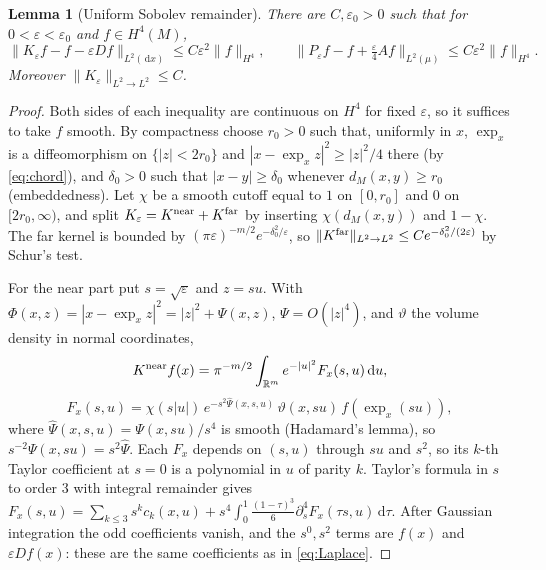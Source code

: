 \documentclass[11pt,a4paper]{article}
\newtheorem{lemma}[theorem]{Lemma}
\theoremstyle{definition}\newtheorem{definition}[theorem]{Definition}
\theoremstyle{remark}\newtheorem{remark}[theorem]{Remark}
\newcommand{\eps}{\varepsilon}
\newcommand{\dd}{\,\mathrm d}
\newcommand{\R}{\mathbb R}
\newcommand{\norm}[1]{\lVert #1\rVert}
\begin{document}
\begin{lemma}[Uniform Sobolev remainder]\label{lem:sobolev}
There are $C,\eps_0>0$ such that for $0<\eps<\eps_0$ and $f\in H^4(M)$,
\begin{equation}\label{eq:sobolevrem}
\norm{K_\eps f-f-\eps Df}_{L^2(\dd x)}\leq C\eps^2\norm f_{H^4},
\qquad
\norm{P_\eps f-f+\tfrac\eps4Af}_{L^2(\mu)}\leq C\eps^2\norm f_{H^4}.
\end{equation}
Moreover $\norm{K_\eps}_{L^2\to L^2}\leq C$.
\end{lemma}
\begin{proof}
Both sides of each inequality are continuous on $H^4$ for fixed $\eps$, so it suffices to take $f$ smooth.
By compactness choose $r_0>0$ such that, uniformly in $x$, $\exp_x$ is a diffeomorphism on $\{|z|<2r_0\}$ and $|x-\exp_xz|^2\geq|z|^2/4$ there (by \eqref{eq:chord}), and $\delta_0>0$ such that $|x-y|\geq\delta_0$ whenever $d_M(x,y)\geq r_0$ (embeddedness). Let $\chi$ be a smooth cutoff equal to $1$ on $[0,r_0]$ and $0$ on $[2r_0,\infty)$, and split $K_\eps=K^{\rm near}+K^{\rm far}$ by inserting $\chi(d_M(x,y))$ and $1-\chi$. The far kernel is bounded by $(\pi\eps)^{-m/2}e^{-\delta_0^2/\eps}$, so $\norm{K^{\rm far}}_{L^2\to L^2}\leq Ce^{-\delta_0^2/(2\eps)}$ by Schur's test.

For the near part put $s=\sqrt\eps$ and $z=su$. With $\Phi(x,z)=|x-\exp_xz|^2=|z|^2+\Psi(x,z)$, $\Psi=O(|z|^4)$, and $\vartheta$ the volume density in normal coordinates,
\[
K^{\rm near}f(x)=\pi^{-m/2}\int_{\R^m}e^{-|u|^2}F_x(s,u)\dd u,\]
\[F_x(s,u)=\chi(s|u|)\,e^{-s^2\widehat\Psi(x,s,u)}\,\vartheta(x,su)\,f(\exp_x(su)),
\]
where $\widehat\Psi(x,s,u)=\Psi(x,su)/s^4$ is smooth (Hadamard's lemma), so $s^{-2}\Psi(x,su)=s^2\widehat\Psi$. Each $F_x$ depends on $(s,u)$ through $su$ and $s^2$, so its $k$-th Taylor coefficient at $s=0$ is a polynomial in $u$ of parity $k$. Taylor's formula in $s$ to order $3$ with integral remainder gives $F_x(s,u)=\sum_{k\le3}s^kc_k(x,u)+s^4\int_0^1\tfrac{(1-\tau)^3}{6}\partial_s^4F_x(\tau s,u)\dd\tau$. After Gaussian integration the odd coefficients vanish, and the $s^0,s^2$ terms are $f(x)$ and $\eps Df(x)$: these are the same coefficients as in \eqref{eq:Laplace}.


\end{proof}
\end{document}
